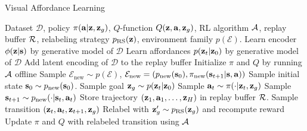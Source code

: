 \begin{algorithm}[t]
\caption{Visual Affordance Learning}
\label{algo:val}
\begin{algorithmic}[1]
\REQUIRE Dataset $\mathcal{D}$, policy $\pi(\mathbf{a}|\mathbf{z}, \mathbf{z}_g)$, $Q$-function $Q(\mathbf{z}, \mathbf{a}, \mathbf{z}_g)$, RL algorithm ${\mathcal{A}}$, replay buffer ${\mathcal{R}}$, relabeling strategy
$p_\text{RS}(\mathbf{z})$, environment family $p(\mathcal{E})$.
\STATE Learn encoder $\phi(\mathbf{z}|\mathbf{s})$ by generative model of $\mathcal{D}$
\STATE Learn affordances $p(\mathbf{z}_t|\mathbf{z}_0)$ by generative model of $\mathcal{D}$
\STATE Add latent encoding of $\mathcal{D}$ to the replay buffer
\STATE Initialize $\pi$ and $Q$ by running ${\mathcal{A}}$ offline
\STATE Sample $\mathcal{E}_\text{new} \sim p(\mathcal{E})$, $\mathcal{E}_\text{new} = \left(p_\text{new}(\mathbf{s}_0), \pi_\text{new}(\mathbf{s}_{t+1} | \mathbf{s}, \mathbf{a})\right)$
    \STATE Sample initial state $\mathbf{s}_0 \sim p_\text{new}(\mathbf{s}_0)$.
    \STATE Sample goal $\mathbf{z}_g \sim p(\mathbf{z}_t|\mathbf{z}_0)$
        \STATE Sample $\mathbf{a}_t \sim \pi(\cdot|\mathbf{z}_t, \mathbf{z}_g)$
        \STATE Sample $\mathbf{s}_{t+1} \sim p_\text{new}(\cdot | \mathbf{s}_t, \mathbf{a}_t)$
    \ENDFOR
    \STATE Store trajectory $(\mathbf{z}_1, \mathbf{a}_1, \dots, \mathbf{z}_H)$ in replay buffer ${\mathcal{R}}$.
        \STATE Sample transition $(\mathbf{z}_t, \mathbf{a}_t, \mathbf{z}_{t+1}, \mathbf{z}_g)$
        \STATE Relabel with $\mathbf{z}_g' \sim p_\text{RS}(\mathbf{z}_g)$ and recompute reward
        \STATE Update $\pi$ and $Q$ with relabeled transition using ${\mathcal{A}}$
    \ENDFOR
\ENDFOR
\end{algorithmic}
\end{algorithm}